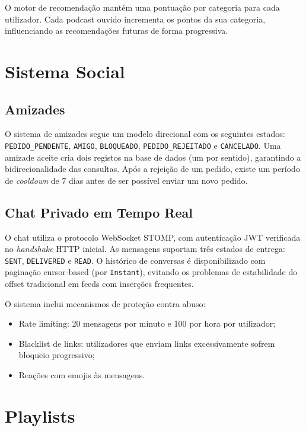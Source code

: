 \documentclass[12pt, a4paper]{report}
\begin{document}
O motor de recomendação mantém uma pontuação por categoria para cada utilizador.
Cada podcast ouvido incrementa os pontos da sua categoria, influenciando as
recomendações futuras de forma progressiva.

\section{Sistema Social}

\subsection{Amizades}

O sistema de amizades segue um modelo direcional com os seguintes estados:
\texttt{PEDIDO\_PENDENTE}, \texttt{AMIGO}, \texttt{BLOQUEADO},
\texttt{PEDIDO\_REJEITADO} e \texttt{CANCELADO}. Uma amizade aceite cria dois
registos na base de dados (um por sentido), garantindo a bidirecionalidade das
consultas. Após a rejeição de um pedido, existe um período de \emph{cooldown}
de 7 dias antes de ser possível enviar um novo pedido.

\subsection{Chat Privado em Tempo Real}

O chat utiliza o protocolo WebSocket STOMP, com autenticação JWT verificada no
\emph{handshake} HTTP inicial. As mensagens suportam três estados de entrega:
\texttt{SENT}, \texttt{DELIVERED} e \texttt{READ}. O histórico de conversas
é disponibilizado com paginação cursor-based (por \texttt{Instant}), evitando
os problemas de estabilidade do offset tradicional em feeds com inserções frequentes.

O sistema inclui mecanismos de proteção contra abuso:
\begin{itemize}
  \item Rate limiting: 20 mensagens por minuto e 100 por hora por utilizador;
  \item Blacklist de links: utilizadores que enviam links excessivamente sofrem bloqueio progressivo;
  \item Reações com emojis às mensagens.
\end{itemize}

\section{Playlists}
\end{document}
